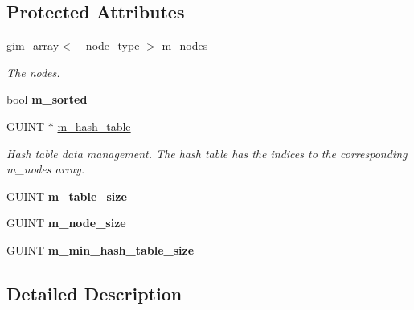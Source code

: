 \subsection*{Protected Attributes}
\begin{DoxyCompactItemize}
\item 
\mbox{\label{classgim__hash__table_ada83cac38bcf3fd282287f463def04e4}} 
\hyperlink{classgim__array}{gim\+\_\+array}$<$ \hyperlink{structGIM__HASH__TABLE__NODE}{\+\_\+node\+\_\+type} $>$ \hyperlink{classgim__hash__table_ada83cac38bcf3fd282287f463def04e4}{m\+\_\+nodes}
\begin{DoxyCompactList}\small\item\em The nodes. \end{DoxyCompactList}\item 
\mbox{\label{classgim__hash__table_adefa6197dfd5c1564969b38d4d27848b}} 
bool {\bfseries m\+\_\+sorted}
\item 
\mbox{\label{classgim__hash__table_ac4f0dd16fac941dd3b485f34083103fb}} 
G\+U\+I\+NT $\ast$ \hyperlink{classgim__hash__table_ac4f0dd16fac941dd3b485f34083103fb}{m\+\_\+hash\+\_\+table}
\begin{DoxyCompactList}\small\item\em Hash table data management. The hash table has the indices to the corresponding m\+\_\+nodes array. \end{DoxyCompactList}\item 
\mbox{\label{classgim__hash__table_a39de8ad99c0fd79c595aa95d14be4e72}} 
G\+U\+I\+NT {\bfseries m\+\_\+table\+\_\+size}
\item 
\mbox{\label{classgim__hash__table_a1f81ffd2e5dd96b222eafa228ae6aa9c}} 
G\+U\+I\+NT {\bfseries m\+\_\+node\+\_\+size}
\item 
\mbox{\label{classgim__hash__table_ad0eb38448dd75c3a7964ff0fd5c6c7d0}} 
G\+U\+I\+NT {\bfseries m\+\_\+min\+\_\+hash\+\_\+table\+\_\+size}
\end{DoxyCompactItemize}


\subsection{Detailed Description}
